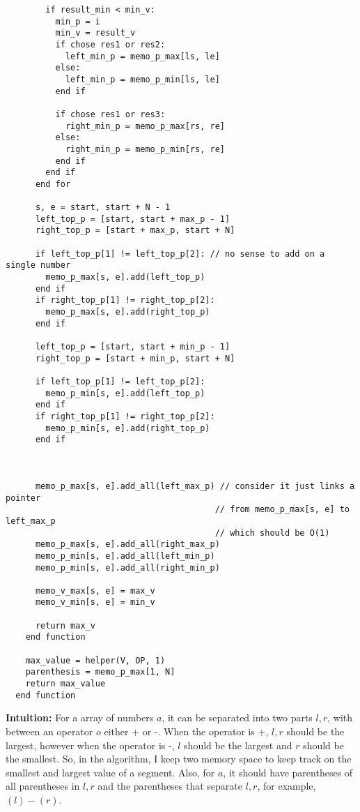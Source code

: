 \documentclass{article}
\begin{document}
\begin{enumerate}[topsep=0pt]
\begin{verbatim}
        if result_min < min_v:
          min_p = i
          min_v = result_v
          if chose res1 or res2:
            left_min_p = memo_p_max[ls, le]
          else:
            left_min_p = memo_p_min[ls, le]
          end if

          if chose res1 or res3:
            right_min_p = memo_p_max[rs, re]
          else:
            right_min_p = memo_p_min[rs, re]
          end if
        end if
      end for

      s, e = start, start + N - 1
      left_top_p = [start, start + max_p - 1]
      right_top_p = [start + max_p, start + N]

      if left_top_p[1] != left_top_p[2]: // no sense to add on a single number
        memo_p_max[s, e].add(left_top_p)
      end if
      if right_top_p[1] != right_top_p[2]:
        memo_p_max[s, e].add(right_top_p)
      end if

      left_top_p = [start, start + min_p - 1]
      right_top_p = [start + min_p, start + N]

      if left_top_p[1] != left_top_p[2]:
        memo_p_min[s, e].add(left_top_p)
      end if
      if right_top_p[1] != right_top_p[2]:
        memo_p_min[s, e].add(right_top_p)
      end if



      memo_p_max[s, e].add_all(left_max_p) // consider it just links a pointer
                                          // from memo_p_max[s, e] to left_max_p
                                          // which should be O(1)
      memo_p_max[s, e].add_all(right_max_p)
      memo_p_min[s, e].add_all(left_min_p)
      memo_p_min[s, e].add_all(right_min_p)
      
      memo_v_max[s, e] = max_v
      memo_v_min[s, e] = min_v

      return max_v
    end function

    max_value = helper(V, OP, 1)
    parenthesis = memo_p_max[1, N]
    return max_value
  end function

\end{verbatim}


\textbf{Intuition:}
For a array of numbers $a$, it can be separated into two parts $l,r$, with between an operator $o$ either + or -.
When the operator is +, $l,r$ should be the largest, however when the operator is -, 
$l$ should be the largest and $r$ should be the smallest.
So, in the algorithm, I keep two memory space to keep track on the smallest and largest value of a segment.
Also, for $a$, it should have parentheses of all parentheses in $l,r$ and the parentheses that separate $l,r$,
for example, $(l)-(r)$.


\end{enumerate}
\end{document}
